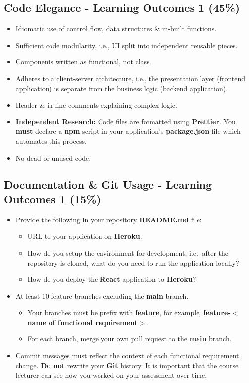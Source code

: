 \documentclass{article}
\begin{document}
\subsection*{Code Elegance - Learning Outcomes 1 (45\%)}
\begin{itemize}
	\item Idiomatic use of control flow, data structures \& in-built functions.
	\item Sufficient code modularity, i.e., UI split into independent reusable pieces.
	\item Components written as functional, not class.
	\item Adheres to a client-server architecture, i.e., the presentation layer (frontend application) is separate from the business logic (backend application).
	\item Header \& in-line comments explaining complex logic.
	\item \textbf{Independent Research:} Code files are formatted using \textbf{Prettier}. You \textbf{must} declare a \textbf{npm} script in your application's \textbf{package.json} file which automates this process.
	\item No dead or unused code.
\end{itemize}

\subsection*{Documentation \& Git Usage - Learning Outcomes 1 (15\%)}
\begin{itemize}
	\item Provide the following in your repository \textbf{README.md} file:
	      \begin{itemize}
		      \item URL to your application on \textbf{Heroku}.
		      \item How do you setup the environment for development, i.e., after the repository is cloned, what do you need to run the application locally?
					\item How do you deploy the \textbf{React} application to \textbf{Heroku}?
	      \end{itemize}
			\end{itemize}
			\begin{itemize}
	\item At least 10 feature branches excluding the \textbf{main} branch.
	\begin{itemize}
			\item Your branches must be prefix with \textbf{feature}, for example, \textbf{feature-$<$name of functional requirement$>$}.
			\item For each branch, merge your own pull request to the \textbf{main} branch.
	\end{itemize}
	\item Commit messages must reflect the context of each functional requirement change. \textbf{Do not} rewrite your \textbf{Git} history. It is important that the course lecturer can see how you worked on your assessment over time.
\end{itemize}
\end{document}
